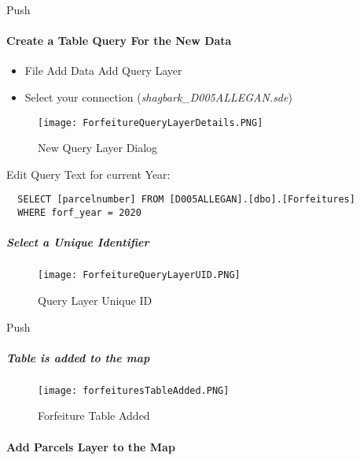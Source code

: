   \vspace{.15in}

 {\bigbtn Push }

 \clearpage





  \paragraph{Create a Table Query For the New Data}

  \begin{itemize}
  \item {File {\menuArrow} Add Data {\menuArrow} Add Query Layer}
  \item {{ Select your connection} (\textit{shagbark\_D005ALLEGAN.sde})}
  \end{itemize}
  \begin{figure}[h!]
  \centering
      \texttt{[image: ForfeitureQueryLayerDetails.PNG]}
  \caption{New Query Layer Dialog}
  \end{figure}
 \vspace{.1in}
 Edit Query Text for current Year:
 \vspace{.1in}
  \begin{verbatim}
  SELECT [parcelnumber] FROM [D005ALLEGAN].[dbo].[Forfeitures]
  WHERE forf_year = 2020
  \end{verbatim}
  \subparagraph{Select a Unique Identifier}
  \begin{figure}[h!]
  \centering
      \texttt{[image: ForfeitureQueryLayerUID.PNG]}
  \caption{Query Layer Unique ID}
  \end{figure}
 {\bigbtn Push }

  \clearpage
  \subparagraph*{Table is added to the map}
  \begin{figure}[h!]
  \centering
      \texttt{[image: forfeituresTableAdded.PNG]}
  \caption{Forfeiture Table Added}
  \end{figure}
  \clearpage
  \paragraph{Add Parcels Layer to the Map}

